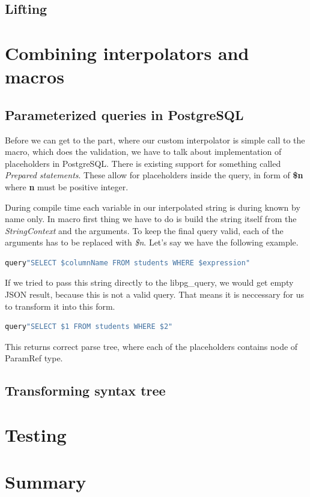 \documentclass[thesis=B,english]{FITthesis}[2019/12/23]
\begin{document}
\subsection{Lifting}

\section{Combining interpolators and macros}
\subsection{Parameterized queries in PostgreSQL}
Before we can get to the part, where our custom interpolator is simple call to the macro, which does the validation, we have to talk about implementation of placeholders in PostgreSQL. There is existing support for something called \textit{Prepared statements}. These allow for placeholders inside the query, in form of \textbf{\$n} where \textbf{n} must be positive integer.  

During compile time each variable in our interpolated string is during known by name only. In macro first thing we have to do is build the string itself from the \textit{StringContext} and the arguments. To keep the final query valid, each of the arguments has to be replaced with \textit{\$n}. 
Let's say we have the following example.
\begin{lstlisting}[language=scala, showstringspaces=false]
query"SELECT $columnName FROM students WHERE $expression"
\end{lstlisting}
If we tried to pass this string directly to the libpg\_query, we would get empty JSON result, because this is not a valid query. That means it is neccessary for us to transform it into this form.
\begin{lstlisting}[language=scala, showstringspaces=false]
query"SELECT $1 FROM students WHERE $2"
\end{lstlisting}
This returns correct parse tree, where each of the placeholders contains node of ParamRef type. 


\subsection{Transforming syntax tree}

\section{Testing}
\section{Summary}
\end{document}
